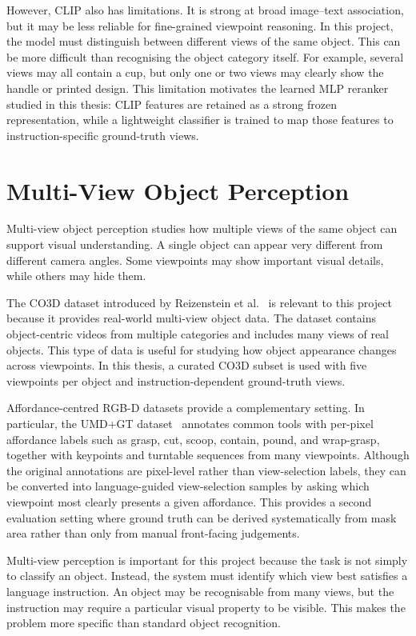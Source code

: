 However, CLIP also has limitations. It is strong at broad image--text association, but it may be less reliable for fine-grained viewpoint reasoning. In this project, the model must distinguish between different views of the same object. This can be more difficult than recognising the object category itself. For example, several views may all contain a cup, but only one or two views may clearly show the handle or printed design. This limitation motivates the learned MLP reranker studied in this thesis: CLIP features are retained as a strong frozen representation, while a lightweight classifier is trained to map those features to instruction-specific ground-truth views.

\section{Multi-View Object Perception}

Multi-view object perception studies how multiple views of the same object can support visual understanding. A single object can appear very different from different camera angles. Some viewpoints may show important visual details, while others may hide them.

The CO3D dataset introduced by Reizenstein et al.~\cite{reizenstein_common_2021} is relevant to this project because it provides real-world multi-view object data. The dataset contains object-centric videos from multiple categories and includes many views of real objects. This type of data is useful for studying how object appearance changes across viewpoints. In this thesis, a curated CO3D subset is used with five viewpoints per object and instruction-dependent ground-truth views.

Affordance-centred RGB-D datasets provide a complementary setting. In particular, the UMD+GT dataset~\cite{myers_umd_affordance} annotates common tools with per-pixel affordance labels such as grasp, cut, scoop, contain, pound, and wrap-grasp, together with keypoints and turntable sequences from many viewpoints. Although the original annotations are pixel-level rather than view-selection labels, they can be converted into language-guided view-selection samples by asking which viewpoint most clearly presents a given affordance. This provides a second evaluation setting where ground truth can be derived systematically from mask area rather than only from manual front-facing judgements.

Multi-view perception is important for this project because the task is not simply to classify an object. Instead, the system must identify which view best satisfies a language instruction. An object may be recognisable from many views, but the instruction may require a particular visual property to be visible. This makes the problem more specific than standard object recognition.

